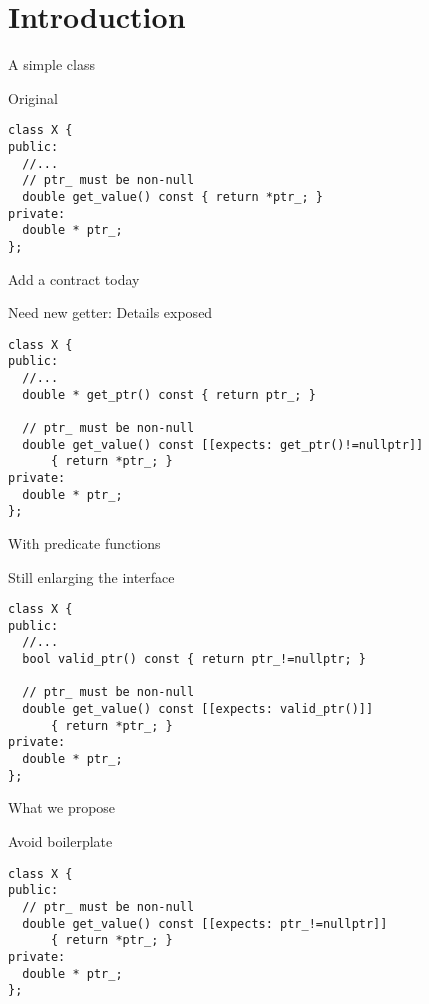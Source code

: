 \section{Introduction}

\begin{frame}[t,fragile]{A simple class}
\begin{block}{Original}
\begin{lstlisting}
class X {
public:
  //...
  // ptr_ must be non-null
  double get_value() const { return *ptr_; }
private:
  double * ptr_; 
};
\end{lstlisting}
\end{block}
\end{frame}

\begin{frame}[t,fragile]{Add a contract today}
\begin{block}{Need new getter: Details exposed}
\begin{lstlisting}
class X {
public:
  //...
  double * get_ptr() const { return ptr_; }

  // ptr_ must be non-null
  double get_value() const [[expects: get_ptr()!=nullptr]] 
      { return *ptr_; }
private:
  double * ptr_; 
};
\end{lstlisting}
\end{block}
\end{frame}

\begin{frame}[t,fragile]{With predicate functions}
\begin{block}{Still enlarging the interface}
\begin{lstlisting}
class X {
public:
  //...
  bool valid_ptr() const { return ptr_!=nullptr; }

  // ptr_ must be non-null
  double get_value() const [[expects: valid_ptr()]] 
      { return *ptr_; }
private:
  double * ptr_; 
};
\end{lstlisting}
\end{block}
\end{frame}

\begin{frame}[t,fragile]{What we propose}
\begin{block}{Avoid boilerplate}
\begin{lstlisting}
class X {
public:
  // ptr_ must be non-null
  double get_value() const [[expects: ptr_!=nullptr]] 
      { return *ptr_; }
private:
  double * ptr_; 
};
\end{lstlisting}
\end{block}
\end{frame}

